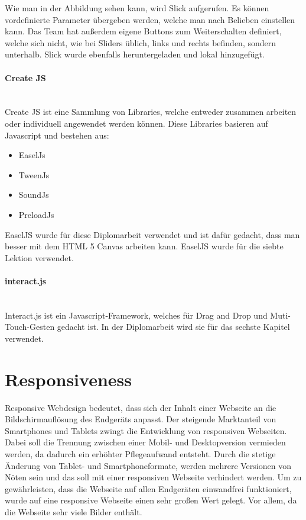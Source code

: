 Wie man in der Abbildung sehen kann, wird Slick aufgerufen. Es können vordefinierte Parameter übergeben werden, welche man nach Belieben einstellen kann. Das Team hat außerdem eigene Buttons zum Weiterschalten definiert, welche sich nicht, wie bei Sliders üblich, links und rechts befinden, sondern unterhalb. Slick wurde ebenfalls heruntergeladen und lokal hinzugefügt.

\paragraph{Create JS} \\
Create JS ist eine Sammlung von Libraries, welche entweder zusammen arbeiten oder individuell angewendet werden können. Diese Libraries basieren auf Javascript und bestehen aus:
\begin{itemize}
\item EaselJs
\item TweenJs
\item SoundJs
\item PreloadJs
\end{itemize}

EaselJS wurde für diese Diplomarbeit verwendet und ist dafür gedacht, dass man besser mit dem HTML 5 Canvas arbeiten kann. EaselJS wurde für die siebte Lektion verwendet. 

\paragraph{interact.js}\\ 
Interact.js ist ein Javascript-Framework, welches für Drag and Drop und Muti-Touch-Gesten gedacht ist. In der Diplomarbeit wird sie für das sechste Kapitel verwendet. 


\section{Responsiveness}
Responsive Webdesign bedeutet, dass sich der Inhalt einer Webseite an die Bildschirmauflösung des Endgeräts anpasst. Der steigende Marktanteil von Smartphones und Tablets zwingt die Entwicklung von responsiven Webseiten. Dabei soll die Trennung zwischen einer Mobil- und Desktopversion vermieden werden, da dadurch ein erhöhter Pflegeaufwand entsteht. Durch die stetige Änderung von Tablet- und Smartphoneformate, werden mehrere Versionen von Nöten sein und das soll mit einer responsiven Webseite verhindert werden. 
Um zu gewährleisten, dass die Webseite auf allen Endgeräten einwandfrei funktioniert, wurde auf eine responsive Webseite einen sehr großen Wert gelegt. Vor allem, da die Webseite sehr viele Bilder enthält.


